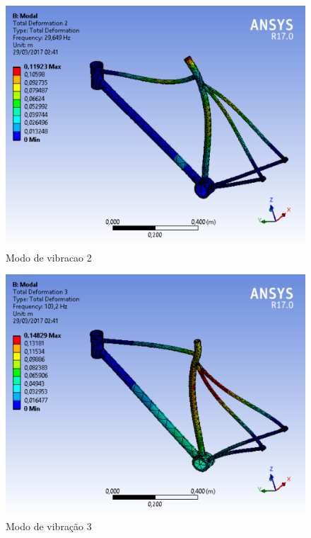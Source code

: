 \graphicspath{{figuras/}}
	\begin{figure}[h!]
	\centering
	\includegraphics[scale=0.80]{modo_de_vibracao_2.png}
	\caption{Modo de vibracao 2}
	\label{img:modo_de_vibracao2}
	\end{figure}	
	
\graphicspath{{figuras/}}
	\begin{figure}[h!]
	\centering
	\includegraphics[scale=0.80]{modo_de_vibracao_3.png}
	\caption{Modo de vibração 3}
	\label{img:modo_de_vibracao3}
	\end{figure}	
	
